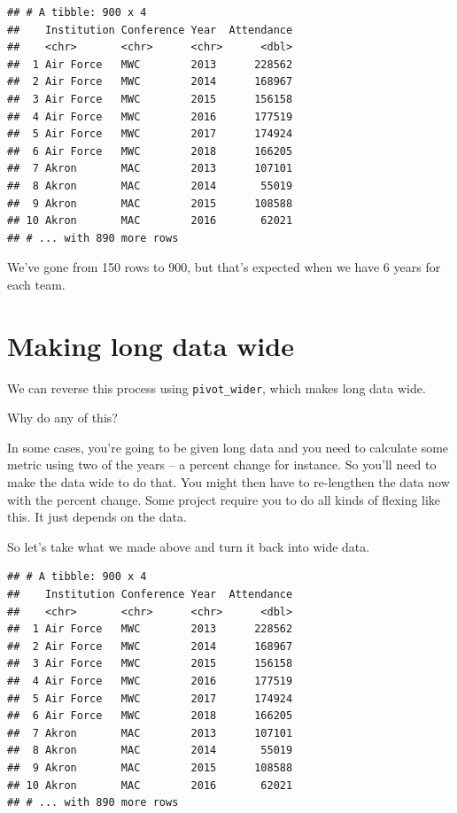 \documentclass[
]{book}
\newenvironment{Shaded}{\begin{snugshade}}{\end{snugshade}}
\newcommand{\DataTypeTok}[1]{\textcolor[rgb]{0.13,0.29,0.53}{#1}}
\newcommand{\KeywordTok}[1]{\textcolor[rgb]{0.13,0.29,0.53}{\textbf{#1}}}
\newcommand{\NormalTok}[1]{#1}
\newcommand{\OperatorTok}[1]{\textcolor[rgb]{0.81,0.36,0.00}{\textbf{#1}}}
\newcommand{\StringTok}[1]{\textcolor[rgb]{0.31,0.60,0.02}{#1}}
\begin{document}
\begin{verbatim}
## # A tibble: 900 x 4
##    Institution Conference Year  Attendance
##    <chr>       <chr>      <chr>      <dbl>
##  1 Air Force   MWC        2013      228562
##  2 Air Force   MWC        2014      168967
##  3 Air Force   MWC        2015      156158
##  4 Air Force   MWC        2016      177519
##  5 Air Force   MWC        2017      174924
##  6 Air Force   MWC        2018      166205
##  7 Akron       MAC        2013      107101
##  8 Akron       MAC        2014       55019
##  9 Akron       MAC        2015      108588
## 10 Akron       MAC        2016       62021
## # ... with 890 more rows
\end{verbatim}

We've gone from 150 rows to 900, but that's expected when we have 6 years for each team.

\hypertarget{making-long-data-wide}{%
\section{Making long data wide}\label{making-long-data-wide}}

We can reverse this process using \texttt{pivot\_wider}, which makes long data wide.

Why do any of this?

In some cases, you're going to be given long data and you need to calculate some metric using two of the years -- a percent change for instance. So you'll need to make the data wide to do that. You might then have to re-lengthen the data now with the percent change. Some project require you to do all kinds of flexing like this. It just depends on the data.

So let's take what we made above and turn it back into wide data.

\begin{Shaded}
\end{Shaded}

\begin{verbatim}
## # A tibble: 900 x 4
##    Institution Conference Year  Attendance
##    <chr>       <chr>      <chr>      <dbl>
##  1 Air Force   MWC        2013      228562
##  2 Air Force   MWC        2014      168967
##  3 Air Force   MWC        2015      156158
##  4 Air Force   MWC        2016      177519
##  5 Air Force   MWC        2017      174924
##  6 Air Force   MWC        2018      166205
##  7 Akron       MAC        2013      107101
##  8 Akron       MAC        2014       55019
##  9 Akron       MAC        2015      108588
## 10 Akron       MAC        2016       62021
## # ... with 890 more rows
\end{verbatim}
\end{document}
